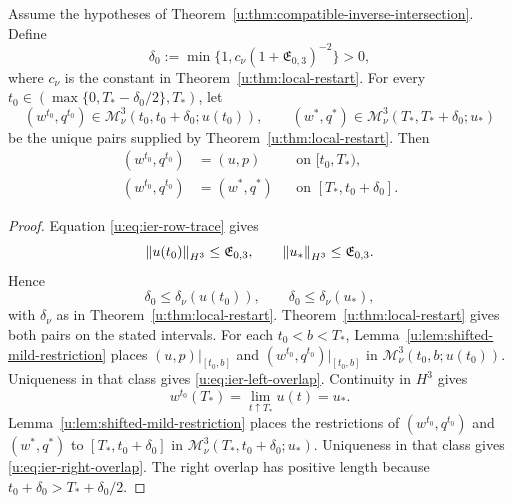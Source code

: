 \begin{lemma}
\label{u:lem:ier-late-slice-overlap}
Assume the hypotheses of
Theorem~\ref{u:thm:compatible-inverse-intersection}.
Define
\begin{equation}
 \delta_0
 :=\min\{1,c_\nu(1+\mathfrak E_{0,3})^{-2}\}>0,
 \label{u:eq:ier-uniform-restart-time}
\end{equation}
where \(c_\nu\) is the constant in Theorem~\ref{u:thm:local-restart}.
For every
\(t_0\in(\max\{0,T_*-\delta_0/2\},T_*)\), let
\[
 (w^{t_0},q^{t_0})
 \in\mathscr M_\nu^3(t_0,t_0+\delta_0;u(t_0)),
 \qquad
 (w^*,q^*)
 \in\mathscr M_\nu^3(T_*,T_*+\delta_0;u_*)
\]
be the unique pairs supplied by Theorem~\ref{u:thm:local-restart}.  Then
\begin{align}
 (w^{t_0},q^{t_0})&=(u,p)
 &&\text{on }[t_0,T_*),
 \label{u:eq:ier-left-overlap}\\
 (w^{t_0},q^{t_0})&=(w^*,q^*)
 &&\text{on }[T_*,t_0+\delta_0].
 \label{u:eq:ier-right-overlap}
\end{align}
\end{lemma}

\begin{proof}
Equation \eqref{u:eq:ier-row-trace} gives
\[
 \left\lVert u(t_0)\right\rVert_{H^3}\le\mathfrak E_{0,3},
 \qquad
 \left\lVert u_*\right\rVert_{H^3}\le\mathfrak E_{0,3}.
\]
Hence
\[
 \delta_0\le\delta_\nu(u(t_0)),
 \qquad
 \delta_0\le\delta_\nu(u_*),
\]
with \(\delta_\nu\) as in Theorem~\ref{u:thm:local-restart}.
Theorem~\ref{u:thm:local-restart} gives both pairs on the stated intervals.
For each \(t_0<b<T_*\), Lemma~\ref{u:lem:shifted-mild-restriction} places
\((u,p)|_{[t_0,b]}\) and
\((w^{t_0},q^{t_0})|_{[t_0,b]}\) in
\(\mathscr M_\nu^3(t_0,b;u(t_0))\).  Uniqueness in that class gives
\eqref{u:eq:ier-left-overlap}.  Continuity in \(H^3\) gives
\[
 w^{t_0}(T_*)=\lim_{t\uparrow T_*}u(t)=u_*.
\]
Lemma~\ref{u:lem:shifted-mild-restriction} places the restrictions of
\((w^{t_0},q^{t_0})\) and \((w^*,q^*)\) to
\([T_*,t_0+\delta_0]\) in
\(\mathscr M_\nu^3(T_*,t_0+\delta_0;u_*)\).  Uniqueness in that class gives
\eqref{u:eq:ier-right-overlap}.  The right overlap has positive length because
\(t_0+\delta_0>T_*+\delta_0/2\).
\end{proof}

